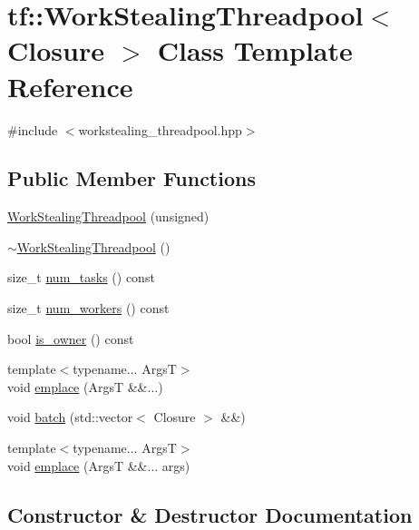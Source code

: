 \hypertarget{classtf_1_1WorkStealingThreadpool}{}\section{tf\+:\+:Work\+Stealing\+Threadpool$<$ Closure $>$ Class Template Reference}
\label{classtf_1_1WorkStealingThreadpool}


{\ttfamily \#include $<$workstealing\+\_\+threadpool.\+hpp$>$}

\subsection*{Public Member Functions}
\begin{DoxyCompactItemize}
\item 
\hyperlink{classtf_1_1WorkStealingThreadpool_a9069a604b03e3f4abd3f9e4668131581}{Work\+Stealing\+Threadpool} (unsigned)
\item 
\hyperlink{classtf_1_1WorkStealingThreadpool_aa18a26ff7202b289b983ce960d4ff5b9}{$\sim$\+Work\+Stealing\+Threadpool} ()
\item 
size\+\_\+t \hyperlink{classtf_1_1WorkStealingThreadpool_a8fab9139bf428a30f0be2b459f7a82ce}{num\+\_\+tasks} () const
\item 
size\+\_\+t \hyperlink{classtf_1_1WorkStealingThreadpool_a0069de0539feee6c7b211662211a81cc}{num\+\_\+workers} () const
\item 
bool \hyperlink{classtf_1_1WorkStealingThreadpool_ab9d2bb67582347321e44e98fa7bb95cc}{is\+\_\+owner} () const
\item 
{\footnotesize template$<$typename... ArgsT$>$ }\\void \hyperlink{classtf_1_1WorkStealingThreadpool_acdd4b5561fe85f1baa0afb9fd936116f}{emplace} (ArgsT \&\&...)
\item 
void \hyperlink{classtf_1_1WorkStealingThreadpool_af8aea2f24e9dd9de605080472568e644}{batch} (std\+::vector$<$ Closure $>$ \&\&)
\item 
{\footnotesize template$<$typename... ArgsT$>$ }\\void \hyperlink{classtf_1_1WorkStealingThreadpool_afc34fd5581ae10fe53bb2e388f6b9237}{emplace} (ArgsT \&\&... args)
\end{DoxyCompactItemize}


\subsection{Constructor \& Destructor Documentation}
\mbox{\label{classtf_1_1WorkStealingThreadpool_a9069a604b03e3f4abd3f9e4668131581}} 
